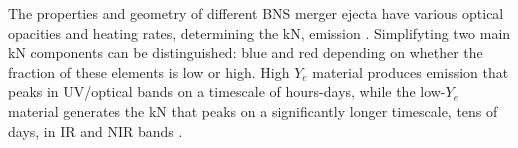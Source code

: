 %
%
%
%
%
%
%




%
The properties and geometry of different \ac{BNS} merger ejecta have various 
optical opacities and heating rates, determining the \ac{kN}, 
emission \citep{Metzger:2019zeh}.
Simplifyting two main \ac{kN} components can be distinguished: blue and red 
depending on whether the fraction of these elements is low or high.
%
High $Y_e$ material produces emission that peaks in \ac{UV}/optical bands on a timescale 
of hours-days, while the low-$Y_e$ material generates the \ac{kN} that peaks on a significantly 
longer timescale, tens of days, in \ac{IR} and \ac{NIR} bands
\citep{Barnes:2013wka,Grossman:2013lqa,Lippuner:2015gwa}.

